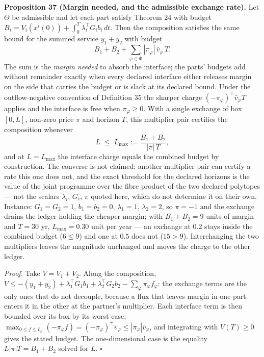 \documentclass[11pt]{article}
\begin{document}
\textbf{Proposition 37 (Margin needed, and the admissible exchange rate).} Let \(\Theta\) be admissible and
let each part satisfy Theorem 24 with budget \(B_i = V_i(x^i(0)) + \int_0^T \lambda_i^{\top} G_i b_i\,dt\). Then the composition satisfies the same bound for the summed service \(y_1 + y_2\) with budget
\[
B_1 + B_2 + \sum_{\varphi \in \Phi} |\pi_\varphi|\, \bar v_\varphi\, T .
\]
The sum is the \emph{margin needed} to absorb the interface; the parts' budgets add without remainder
exactly when every declared interface either releases margin on the side that carries the budget or is
slack at its declared bound. Under the outflow-negative convention of Definition 35 the sharper charge
\((-\pi_\varphi)^{+}\bar v_\varphi T\) applies and the interface is free when \(\pi_\varphi \ge 0\).
With a single exchange of box \([0, L]\), non-zero price \(\pi\) and horizon \(T\), this multiplier pair
certifies the composition whenever
\[
L \;\le\; L_{\max} := \frac{B_1 + B_2}{|\pi|\, T},
\]
and at \(L = L_{\max}\) the interface charge equals the combined budget by construction. The converse is not
claimed: another multiplier pair can certify a rate this one does not, and the exact threshold for the
declared horizons is the value of the joint programme over the fibre product of the two declared polytopes
--- not the scalars \(\lambda_i\), \(G_i\), \(\pi\) quoted here, which do not determine it on their own.
Instance: \(G_1 = G_2 = 1\), \(b_1 = b_2 = 0\), \(\lambda_1 = 1\), \(\lambda_2 = 2\), so \(\pi = -1\) and the
exchange drains the ledger holding the cheaper margin; with \(B_1 + B_2 = 9\) units of margin and \(T = 30\)
yr, \(L_{\max} = 0.30\) unit per year --- an exchange at \(0.2\) stays inside the combined budget (\(6 \le 9\))
and one at \(0.5\) does not (\(15 > 9\)). Interchanging the two multipliers leaves the magnitude unchanged and
moves the charge to the other ledger.

\emph{Proof.} Take \(V = V_1 + V_2\). Along the composition, \(\dot V \le -(y_1 + y_2) + \lambda_1^{\top} G_1 b_1 + \lambda_2^{\top} G_2 b_2 - \sum_\varphi \pi_\varphi f_\varphi\): the exchange terms are the only ones that do not
decouple, because a flux that leaves margin in one part enters it in the other at the partner's
multiplier. Each interface term is then bounded over its box by its worst case,
\(\max_{0 \le f \le \bar v_\varphi}(-\pi_\varphi f) = (-\pi_\varphi)^{+}\bar v_\varphi \le |\pi_\varphi|\bar v_\varphi\), and integrating with \(V(T) \ge 0\) gives the stated budget. The
one-dimensional case is the equality \(L|\pi|T = B_1 + B_2\) solved for \(L\). \ensuremath{\square}
\end{document}
